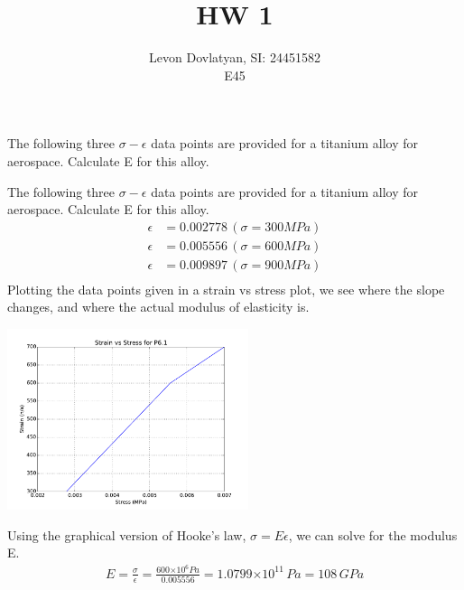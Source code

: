 \documentclass[12pt]{article}
\newenvironment{problem}[2][Problem]{\begin{trivlist}
\item[\hskip \labelsep {\bfseries #1}\hskip \labelsep {\bfseries #2.}]}{\end{trivlist}}
\begin{document}
\providecommand{\e}[1]{\ensuremath{\times 10^{#1}}}
 
\title{HW 1}%
\author{Levon Dovlatyan, SI: 24451582\\ %
E45} %
 
\maketitle
 
\begin{problem}{6.1} %
The following three $\sigma - \epsilon$ data points are provided for a titanium alloy for aerospace. Calculate E for this alloy.
\end{problem}
 
The following three $\sigma - \epsilon$ data points are provided for a titanium alloy for aerospace. Calculate E for this alloy.
\begin{align*}
\epsilon & = 0.002778 \, (\sigma = 300 MPa)\\ 
\epsilon & = 0.005556 \, (\sigma = 600 MPa)\\
\epsilon & = 0.009897 \, (\sigma = 900 MPa)\\
\end{align*}
Plotting the data points given in a strain vs stress plot, we see where the slope changes, and where the actual modulus of elasticity is.
\begin{center}
\includegraphics[height=150pt]{graph_p6_1.pdf}
\end{center}
Using the graphical version of Hooke's law, $\sigma = E\epsilon$, we can solve for the modulus E.
\begin{align*}
E = \frac{\sigma}{\epsilon} = \frac{600 \e{6} Pa}{0.005556} = 1.0799 \e{11} \, Pa = 108 \, GPa\\
\end{align*}
\end{document}
